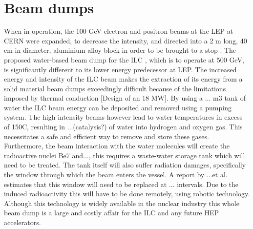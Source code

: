 \section{Beam dumps}\vspace{-8pt}

When in operation, the 100 GeV electron and positron beams at the LEP at CERN were expanded, to decrease the intensity, and directed into a 2 m long, 40 cm in diameter, aluminium alloy block in order to be brought to a stop \cite{LEP_dump}. The proposed water-based beam dump for the ILC \cite{Satyamurthy2012}, which is to operate at 500 GeV, is significantly different to its lower energy predecessor at LEP. The increased energy and intensity of the ILC beam makes the extraction of its energy from a solid material beam dumps exceedingly difficult because of the limitations imposed by thermal conduction [Design of an 18 MW]. By using a ... m3 tank of water the ILC beam energy can be deposited and removed using a pumping system. The high intensity beams however lead to water temperatures in excess of 150\degree C, resulting in ...(catalysis?) of water into hydrogen and oxygen gas. This necessitates a safe and efficient way to remove and store these gases. Furthermore, the beam interaction with the water molecules will create the radioactive nuclei Be7 and..., this requires a waste-water storage tank which will need to be treated. The tank itself will also suffer radiation damages, specifically the window through which the beam enters the vessel. A report by ...et al. \cite{Satyamurthy2012} estimates that this window will need to be replaced at ... intervals. Due to the induced radioactivity this will have to be done remotely, using robotic technology. Although this technology is widely available in the nuclear industry this whole beam dump is a large and costly affair for the ILC and any future HEP accelerators. \\
